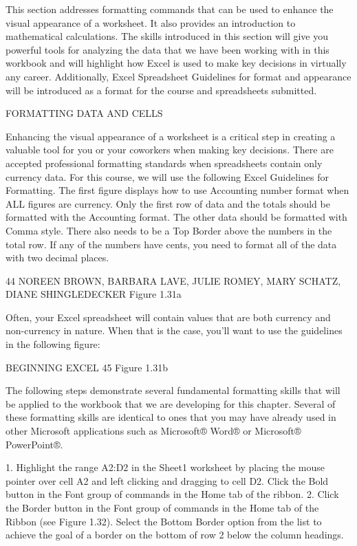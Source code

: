 This section addresses formatting commands that can be used to enhance the visual appearance of
a worksheet. It also provides an introduction to mathematical calculations. The skills introduced in
this section will give you powerful tools for analyzing the data that we have been working with in
this workbook and will highlight how Excel is used to make key decisions in virtually any career.
Additionally, Excel Spreadsheet Guidelines for format and appearance will be introduced as a format
for the course and spreadsheets submitted.

FORMATTING DATA AND CELLS

Enhancing the visual appearance of a worksheet is a critical step in creating a valuable tool for you
or your coworkers when making key decisions. There are accepted professional formatting standards
when spreadsheets contain only currency data. For this course, we will use the following Excel
Guidelines for Formatting. The first figure displays how to use Accounting number format when ALL
figures are currency. Only the first row of data and the totals should be formatted with the Accounting
format. The other data should be formatted with Comma style. There also needs to be a Top Border
above the numbers in the total row. If any of the numbers have cents, you need to format all of the
data with two decimal places.




44 NOREEN BROWN, BARBARA LAVE, JULIE ROMEY, MARY SCHATZ, DIANE SHINGLEDECKER
Figure 1.31a


Often, your Excel spreadsheet will contain values that are both currency and non-currency in nature.
When that is the case, you’ll want to use the guidelines in the following figure:




BEGINNING EXCEL 45
Figure 1.31b


The following steps demonstrate several fundamental formatting skills that will be applied to the
workbook that we are developing for this chapter. Several of these formatting skills are identical to
ones that you may have already used in other Microsoft applications such as Microsoft® Word® or
Microsoft® PowerPoint®.

1. Highlight the range A2:D2 in the Sheet1 worksheet by placing the mouse pointer over cell A2
and left clicking and dragging to cell D2. Click the Bold button in the Font group of commands
in the Home tab of the ribbon.
2. Click the Border button in the Font group of commands in the Home tab of the Ribbon
(see Figure 1.32). Select the Bottom Border option from the list to achieve the goal of a border
on the bottom of row 2 below the column headings.




